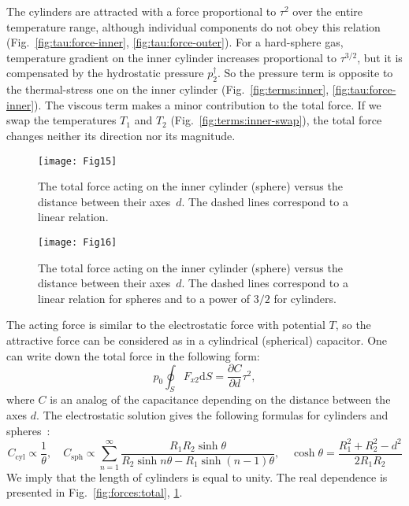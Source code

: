 \documentclass[smallextended, final]{svjour3} %
\newcommand{\dd}{\mathrm{d}}
\newcommand{\pder}[2][]{\frac{\partial#1}{\partial#2}}
\begin{document}
The cylinders are attracted with a force proportional to \(\tau^2\) over the entire temperature range,
although individual components do not obey this relation (Fig.~\ref{fig:tau:force-inner}, \ref{fig:tau:force-outer}).
For a hard-sphere gas, temperature gradient on the inner cylinder increases proportional to \(\tau^{3/2}\),
but it is compensated by the hydrostatic pressure \(p^\dag_2\).
So the pressure term is opposite to the thermal-stress one on the inner cylinder
(Fig.~\ref{fig:terms:inner}, \ref{fig:tau:force-inner}).
The viscous term makes a minor contribution to the total force.
If we swap the temperatures \(T_1\) and \(T_2\) (Fig.~\ref{fig:terms:inner-swap}),
the total force changes neither its direction nor its magnitude.

\begin{figure}[ht]
    \centering
    \begin{minipage}{.48\textwidth}
        \centering
        \texttt{[image: Fig15]}
        \caption{The total force acting on the inner cylinder (sphere)
                versus the distance between their axes~\(d\).
                The dashed lines correspond to a linear relation.}
        \label{fig:forces:total}
    \end{minipage}
    \quad
    \begin{minipage}{.48\textwidth}
        \centering
        \texttt{[image: Fig16]}
        \caption{The total force acting on the inner cylinder (sphere)
                versus the distance between their axes~\(d\).
                The dashed lines correspond to a linear relation for spheres
                and to a power of \(3/2\) for cylinders.}
        \label{fig:forces:inverse}
    \end{minipage}
\end{figure}

The acting force is similar to the electrostatic force with potential \(T\),
so the attractive force can be considered as in a cylindrical (spherical) capacitor.
One can write down the total force in the following form:
\begin{equation}
    p_0\oint_S F_{x2}\dd{S} = \pder[C]{d} \tau^2,
\end{equation}
where \(C\) is an analog of the capacitance depending on the distance between the axes \(d\).
The electrostatic solution gives the following formulas for cylinders and spheres~\cite{Smythe1968Electricity}:
\begin{equation}
    C_\mathrm{cyl} \propto \frac1{\theta}, \quad
    C_\mathrm{sph} \propto  \sum_{n=1}^\infty \frac{R_1 R_2 \sinh\theta} {R_2\sinh n\theta - R_1\sinh (n-1)\theta}, \quad
    \cosh\theta = \frac{R_1^2 + R_2^2 - d^2}{2 R_1 R_2}
\end{equation}
We imply that the length of cylinders is equal to unity.
The real dependence is presented in Fig.~\ref{fig:forces:total}, \ref{fig:forces:inverse}.
\end{document}
